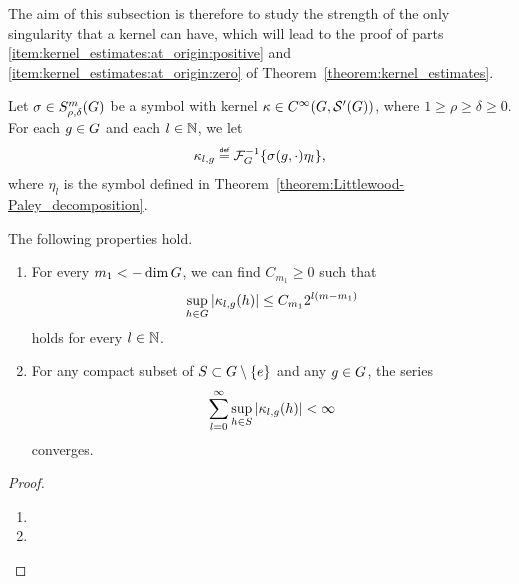The aim of this subsection is therefore to study the strength of the only singularity that a kernel can have,
which will lead to the proof of parts \ref{item:kernel_estimates:at_origin:positive} and \ref{item:kernel_estimates:at_origin:zero} of Theorem~\ref{theorem:kernel_estimates}.

\begin{lemma}
\label{lemma:prepare_kernel_estimates_at_the_origin}
    Let $\sigma \in S^{m}_{\rho, \delta}(G)$ be a symbol
    with kernel $\kappa \in {C^\infty(G, {\mathcal{S}' (G)})}$,
    where $1 \geq \rho \geq \delta \geq 0$.
    For each $g \in G$ and each $l \in \mathbb{N}$,
    we let
    \begin{align*}
        \kappa_{l, g} \defeq \InverseFourier \{ \sigma(g, \dummy) \eta_l \},
    \end{align*}
    where $\eta_l$ is the symbol defined in Theorem~\ref{theorem:Littlewood-Paley_decomposition}.

    The following properties hold.
    \begin{enumerate}
        \item For every $m_1 < -\dim G$,
            we can find $C_{m_1} \geq 0$ such that
            \begin{align*}
                \sup_{h \in G} \left|{\kappa_{l, g}(h)}\right| \leq C_{m_1} 2^{l(m - m_1)}
            \end{align*}
            holds for every $l \in \mathbb{N}$.
        \item For any compact subset of $S \subset G \setminus \{e\}$ and any $g \in G$,
            the series
            \begin{align*}
                \sum_{l = 0}^\infty \sup_{h \in S} \left|{\kappa_{l, g}(h)}\right| < \infty
            \end{align*}
            converges.
    \end{enumerate}
\end{lemma}
\begin{proof}
    \begin{enumerate}
        \item
        \item
    \end{enumerate}
\end{proof}

